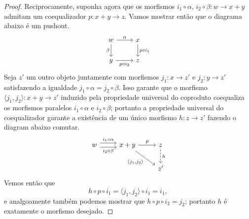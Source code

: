 \begin{proof}
    Reciprocamente, suponha agora que os morfismos $i_1 \circ \alpha,\, i_2 \circ \beta: w \to x+y$ admitam um coequalizador $p: x+y \to z$.
    Vamos mostrar então que o diagrama abaixo é um pushout.
    \begin{displaymath}
        \begin{tikzcd}
            w
            \arrow[r, "\alpha"]
            \arrow[d, "\beta" swap]
            & x
            \arrow[d, "p \circ i_1"]
            \\ y
            \arrow[r, "p \circ i_2" swap]
            & z
        \end{tikzcd}
    \end{displaymath}
    Seja $z'$ um outro objeto juntamente com morfismos $j_1: x \to z'$ e $j_2: y \to z'$ satisfazendo a igualdade $j_1 \circ \alpha = j_2 \circ \beta$.
    Isso garante que o morfismo $\langle j_1,j_2 \rangle: x+y \to z'$ induzido pela propriedade universal do coproduto coequaliza os morfismos paralelos $i_1 \circ \alpha$ e $i_2 \circ \beta$; portanto a propriedade universal do coequalizador garante a existência de um único morfismo $h: z \to z'$ fazendo o diagram abaixo comutar.
    \begin{displaymath}
        \begin{tikzcd}
            w
            \arrow[r, shift left=1.25, "i_1 \circ \alpha"]
            \arrow[r, shift right=1.25, "i_2 \circ \beta" swap]
            & x+y
            \arrow[r, "p"]
            \arrow[rd, "{\langle j_1,j_2 \rangle}" swap]
            & z
            \arrow[d, dashed, "h"]
            \\ & & z'
        \end{tikzcd}
    \end{displaymath}
    Vemos então que
    \begin{displaymath}
        h \circ p \circ i_1
        = \langle j_1,j_2 \rangle \circ i_1
        = i_1,
    \end{displaymath}
    e analgoamente também podemos mostrar que $h \circ p \circ i_2 = j_2$; portanto $h$ é exatamente o morfismo desejado.
\end{proof}

